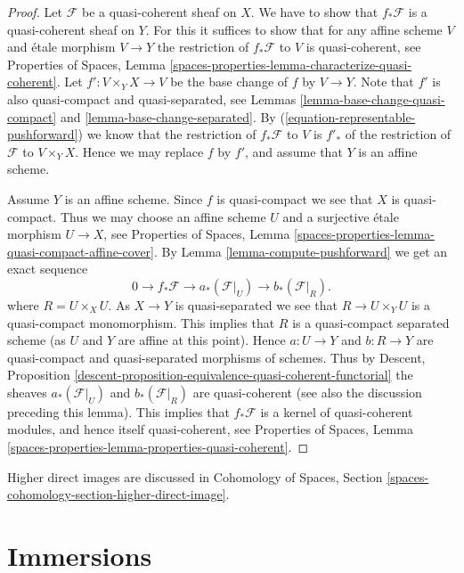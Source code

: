 \documentclass{stacks-project}
\theoremstyle{plain}
\theoremstyle{definition}
\theoremstyle{remark}
\numberwithin{equation}{subsection}
\begin{document}
\begin{proof}
Let $\mathcal{F}$ be a quasi-coherent sheaf on $X$. We have to show that
$f_*\mathcal{F}$ is a quasi-coherent sheaf on $Y$. For this it suffices
to show that for any affine scheme $V$ and \'etale morphism $V \to Y$
the restriction of $f_*\mathcal{F}$ to $V$ is quasi-coherent, see
Properties of Spaces,
Lemma \ref{spaces-properties-lemma-characterize-quasi-coherent}.
Let $f' : V \times_Y X \to V$
be the base change of $f$ by $V \to Y$. Note that $f'$ is also
quasi-compact and quasi-separated, see
Lemmas \ref{lemma-base-change-quasi-compact} and
\ref{lemma-base-change-separated}.
By (\ref{equation-representable-pushforward})
we know that the restriction of $f_*\mathcal{F}$ to $V$ is $f'_*$ of the
restriction of $\mathcal{F}$ to $V \times_Y X$. Hence
we may replace $f$ by $f'$, and assume that $Y$ is an affine scheme.

\medskip\noindent
Assume $Y$ is an affine scheme. Since $f$ is quasi-compact we see that $X$
is quasi-compact. Thus we may choose an affine scheme $U$ and a surjective
\'etale morphism $U \to X$, see
Properties of Spaces,
Lemma \ref{spaces-properties-lemma-quasi-compact-affine-cover}.
By Lemma \ref{lemma-compute-pushforward} we get an exact sequence
$$
0 \to f_*\mathcal{F} \to a_*(\mathcal{F}|_U) \to b_*(\mathcal{F}|_R).
$$
where $R = U \times_X U$.
As $X \to Y$ is quasi-separated we see that $R \to U \times_Y U$
is a quasi-compact monomorphism. This implies that $R$ is a quasi-compact
separated scheme (as $U$ and $Y$ are affine at this point).
Hence $a : U \to Y$ and $b : R \to Y$ are quasi-compact and
quasi-separated morphisms of schemes. Thus by
Descent,
Proposition \ref{descent-proposition-equivalence-quasi-coherent-functorial}
the sheaves $a_*(\mathcal{F}|_U)$ and $b_*(\mathcal{F}|_R)$
are quasi-coherent (see also the discussion preceding this lemma).
This implies that $f_*\mathcal{F}$ is a kernel of
quasi-coherent modules, and hence itself quasi-coherent, see
Properties of Spaces,
Lemma \ref{spaces-properties-lemma-properties-quasi-coherent}.
\end{proof}

\noindent
Higher direct images are discussed in
Cohomology of Spaces, Section
\ref{spaces-cohomology-section-higher-direct-image}.









\section{Immersions}
\label{section-immersions}
\end{document}
